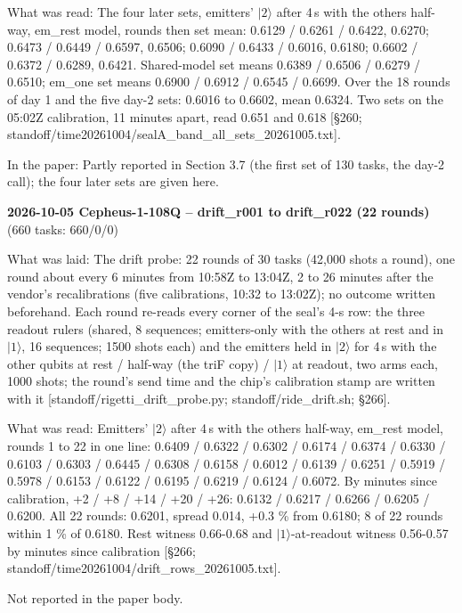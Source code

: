 \documentclass[11pt]{article}
\begin{document}
What was read: The four later sets, emitters' \(|2\rangle\) after 4\,\textmu s with the others half-way, em\_rest model, rounds then set mean: 0.6129 / 0.6261 / 0.6422, 0.6270; 0.6473 / 0.6449 / 0.6597, 0.6506; 0.6090 / 0.6433 / 0.6016, 0.6180; 0.6602 / 0.6372 / 0.6289, 0.6421. Shared-model set means 0.6389 / 0.6506 / 0.6279 / 0.6510; em\_one set means 0.6900 / 0.6912 / 0.6545 / 0.6699. Over the 18 rounds of day 1 and the five day-2 sets: 0.6016 to 0.6602, mean 0.6324. Two sets on the 05:02Z calibration, 11 minutes apart, read 0.651 and 0.618 {[}\S{}260; standoff/time20261004/sealA\_band\_all\_sets\_20261005.txt{]}.

In the paper: Partly reported in Section 3.7 (the first set of 130 tasks, the day-2 call); the four later sets are given here.

\textbf{2026-10-05 Cepheus-1-108Q -- drift\_r001 to drift\_r022 (22 rounds)} (660 tasks: 660/0/0)

What was laid: The drift probe: 22 rounds of 30 tasks (42,000 shots a round), one round about every 6 minutes from 10:58Z to 13:04Z, 2 to 26 minutes after the vendor's recalibrations (five calibrations, 10:32 to 13:02Z); no outcome written beforehand. Each round re-reads every corner of the seal's 4-\textmu s row: the three readout rulers (shared, 8 sequences; emitters-only with the others at rest and in \(|1\rangle\), 16 sequences; 1500 shots each) and the emitters held in \(|2\rangle\) for 4\,\textmu s with the other qubits at rest / half-way (the triF copy) / \(|1\rangle\) at readout, two arms each, 1000 shots; the round's send time and the chip's calibration stamp are written with it {[}standoff/rigetti\_drift\_probe.py; standoff/ride\_drift.sh; \S{}266{]}.

What was read: Emitters' \(|2\rangle\) after 4\,\textmu s with the others half-way, em\_rest model, rounds 1 to 22 in one line: 0.6409 / 0.6322 / 0.6302 / 0.6174 / 0.6374 / 0.6330 / 0.6103 / 0.6303 / 0.6445 / 0.6308 / 0.6158 / 0.6012 / 0.6139 / 0.6251 / 0.5919 / 0.5978 / 0.6153 / 0.6122 / 0.6195 / 0.6219 / 0.6124 / 0.6072. By minutes since calibration, +2 / +8 / +14 / +20 / +26: 0.6132 / 0.6217 / 0.6266 / 0.6205 / 0.6200. All 22 rounds: 0.6201, spread 0.014, +0.3 \% from 0.6180; 8 of 22 rounds within 1 \% of 0.6180. Rest witness 0.66-0.68 and \(|1\rangle\)-at-readout witness 0.56-0.57 by minutes since calibration {[}\S{}266; standoff/time20261004/drift\_rows\_20261005.txt{]}.

Not reported in the paper body.
\end{document}

